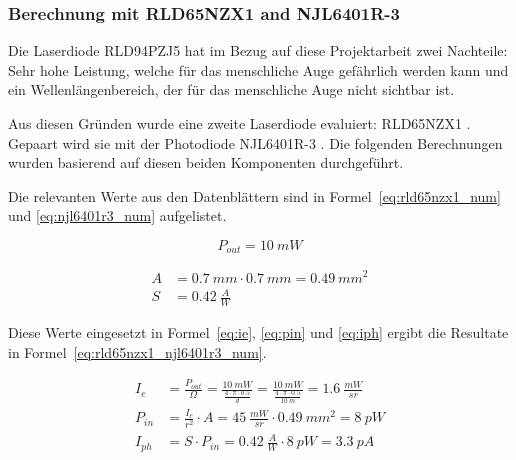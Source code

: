\documentclass[11pt,a4paper,hidelinks]{article}
\begin{document}
\subsubsection{Berechnung mit RLD65NZX1 and NJL6401R-3}

Die Laserdiode RLD94PZJ5 hat im Bezug auf diese Projektarbeit zwei Nachteile: Sehr hohe Leistung, welche für das menschliche Auge gefährlich werden kann und ein Wellenlängenbereich, der für das menschliche Auge nicht sichtbar ist.

Aus diesen Gründen wurde eine zweite Laserdiode evaluiert: RLD65NZX1 \cite{rohm2019rld65nzx1_datasheet}. Gepaart wird sie mit der Photodiode NJL6401R-3 \cite{jrc2014njl6401r3_datasheet}. Die folgenden Berechnungen wurden basierend auf diesen beiden Komponenten durchgeführt.

Die relevanten Werte aus den Datenblättern sind in Formel~\ref{eq:rld65nzx1_num} und \ref{eq:njl6401r3_num} aufgelistet.

\begin{equation}\label{eq:rld65nzx1_num}
    P_{out} = 10~mW
\end{equation}

\begin{equation}\label{eq:njl6401r3_num}
    \begin{split}
        A &= 0.7~mm \cdot 0.7~mm = 0.49~mm^2\\
        S &= 0.42~\frac{A}{W}
    \end{split}
\end{equation}

Diese Werte eingesetzt in Formel~\ref{eq:ie}, \ref{eq:pin} und \ref{eq:iph} ergibt die Resultate in Formel~\ref{eq:rld65nzx1_njl6401r3_num}.

\begin{equation}\label{eq:rld65nzx1_njl6401r3_num}
    \begin{split}
        I_e    &= \frac{P_{out}}{\Omega} = \frac{10~mW}{\frac{4\cdot \pi \cdot 0.5}{d}} = \frac{10~mW}{\frac{4\cdot \pi \cdot 0.5}{10~m}} = 1.6~\frac{mW}{sr}\\
        P_{in} &= \frac{I_e}{r^2} \cdot A = 45~\frac{mW}{sr} \cdot 0.49~mm^2 = 8~pW\\
        I_{ph} &= S \cdot P_{in} = 0.42~\frac{A}{W} \cdot 8~pW = 3.3~pA
    \end{split}
\end{equation}
\end{document}
